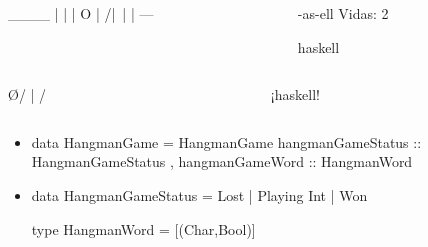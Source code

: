 \documentclass[spanish]{beamer}
\begin{document}

\begin{frame}[fragile]
  \begin{columns}[onlytextwidth,T]
    \begin{column}{.5\textwidth}
        \begin{code}
  ____
  |  |
  |  O
  | /|\
  |
  |
 ---
        \end{code}
    \end{column}
    \begin{column}{.5\textwidth}
      \begin{code}


 -as-ell          Vidas: 2

 haskell


      \end{code}
    \end{column}
  \end{columns}
\end{frame}


\begin{frame}[fragile]
  \begin{columns}[onlytextwidth,T]
    \begin{column}{.5\textwidth}
        \begin{code}


    \O/
     |
    / \


        \end{code}
    \end{column}
    \begin{column}{.5\textwidth}
      \begin{code}


¡haskell!




      \end{code}
    \end{column}
  \end{columns}
\end{frame}


\begin{frame}[fragile]
  \begin{itemize}
  \item
    \begin{code}
data HangmanGame = HangmanGame
  { hangmanGameStatus :: HangmanGameStatus
  , hangmanGameWord   :: HangmanWord
  }
    \end{code}
  \item
    \begin{code}
data HangmanGameStatus
  = Lost
  | Playing Int
  | Won

type HangmanWord = [(Char,Bool)]
    \end{code}
  \end{itemize}
\end{frame}
\end{document}
